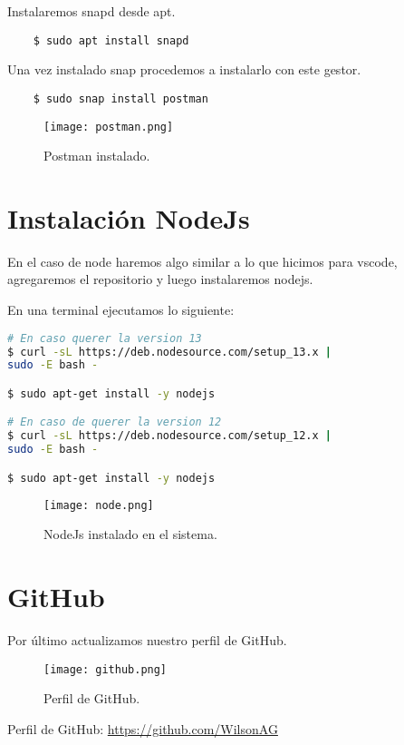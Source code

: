 \documentclass[12pt]{article}
\begin{document}
Instalaremos snapd desde apt.

\begin{lstlisting}
    $ sudo apt install snapd
\end{lstlisting}

Una vez instalado snap procedemos a instalarlo con este gestor.

\begin{lstlisting}
    $ sudo snap install postman
\end{lstlisting}

\begin{figure}
    \centering
    \texttt{[image: postman.png]}
    \caption{Postman instalado.}
\end{figure}

\section{Instalación NodeJs}
En el caso de node haremos algo similar a lo que hicimos para vscode, agregaremos el repositorio y luego instalaremos nodejs.

En una terminal ejecutamos lo siguiente:

\begin{lstlisting}[language=bash]
# En caso querer la version 13
$ curl -sL https://deb.nodesource.com/setup_13.x | 
sudo -E bash -

$ sudo apt-get install -y nodejs

# En caso de querer la version 12
$ curl -sL https://deb.nodesource.com/setup_12.x | 
sudo -E bash -

$ sudo apt-get install -y nodejs

\end{lstlisting}

\begin{figure}[H]
    \centering
    \texttt{[image: node.png]}
    \caption{NodeJs instalado en el sistema.}
\end{figure}


\section{GitHub}

Por último actualizamos nuestro perfil de GitHub.

\begin{figure}[H]
    \centering
    \texttt{[image: github.png]}
    \caption{Perfil de GitHub.}
\end{figure}

Perfil de GitHub: \url{https://github.com/WilsonAG}
\end{document}
